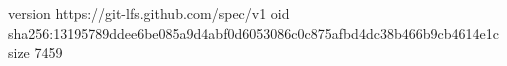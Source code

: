 version https://git-lfs.github.com/spec/v1
oid sha256:13195789ddee6be085a9d4abf0d6053086c0c875afbd4dc38b466b9cb4614e1c
size 7459

